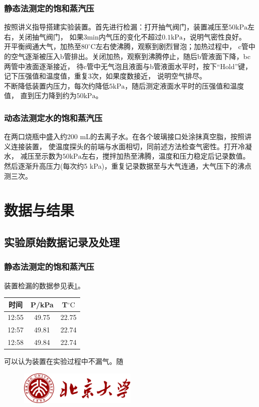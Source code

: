 \documentclass[12pt]{article}
\newcommand{\mr}[1]{\mathrm{#1}}
\def\celsius{^{\circ}\mr{C}}  %
\begin{document}
			\subsubsection{静态法测定的饱和蒸汽压}
			按照讲义指导搭建实验装置。首先进行检漏：打开抽气阀门，装置减压至$50\mr{kPa}$左右，关闭抽气阀门，
			如果3min内气压的变化不超过$0.1\mr{kPa}$，说明气密性良好。\\
			开平衡阀通大气，加热至$80\celsius$左右使沸腾，观察到剧烈冒泡；加热过程中，
			c管中的空气逐渐被压入b管排出。关闭加热，观察到沸腾停止，随后b管液面下降，bc两管中液面逐渐接近，
			待c管中无气泡且液面与b管液面水平时，按下“Hold”键，记下压强值和温度值，重复3次，如果度数接近，
			说明空气排尽。\\
			不断降低装置内压力，每次约降低$5\mr{kPa}$，随后测定液面水平时的压强值和温度值，
			直到压力降到约为$50\mr{kPa}$。

			\subsubsection{动态法测定水的饱和蒸汽压}
			在两口烧瓶中盛入约200 mL的去离子水。在各个玻璃接口处涂抹真空脂，按照讲义连接装置，
			使温度探头的前端与水面相切，同前述方法检查气密性。打开冷凝水，
			减压至示数为$50\mr{kPa}$左右，搅拌加热至沸腾，温度和压力稳定后记录数值。
			然后逐渐升高压力(每次约5 kPa)，重复记录数据至与大气连通，大气压下的沸点测三次。

	\vbox{}  
	\section{数据与结果}
 		\subsection{实验原始数据记录及处理}
 		\subsubsection{静态法测定的饱和蒸汽压}
		装置检漏的数据参见表\ref{static detection}。
		\begin{table}[h]
			\centering
			\begin{tabular}{ccc}
				\toprule
				时间 & P/kPa & T$\celsius$ \\
				\midrule
				12:55 & 49.75 & 22.75  \\
				12:57 & 49.81 & 22.74  \\
				12:58 & 49.84 & 22.74  \\
				\bottomrule
			\end{tabular}
			\label{static detection}
		\end{table}
		可以认为装置在实验过程中不漏气。随
 		\begin{figure}[h]
 			\centering
 			\includegraphics[width=0.5\textwidth]{pku.png}
 		\end{figure}
 	
\end{document}
